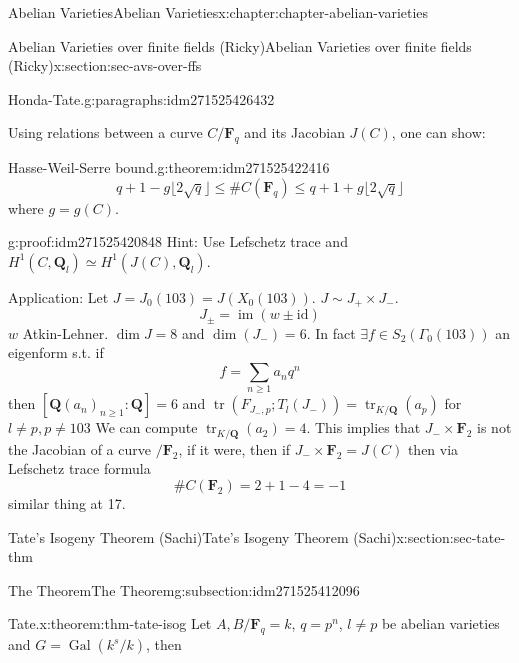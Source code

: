 \documentclass[oneside,10pt,]{book}
\numberwithin{equation}{section}
\newcommand{\lb}{[}
\newcommand{\rb}{]}
\newcommand{\QQ}{\mathbf{Q}}
\newcommand{\FF}{\mathbf{F}}
\newcommand{\id}{\mathrm{id}}
\DeclareMathOperator{\im}{im}
\DeclareMathOperator{\tr}{tr}
\newcommand{\Gal}[2]{\operatorname{Gal}(#1/#2)}
\begin{document}
\begin{chapterptx}{Abelian Varieties}{}{Abelian Varieties}{}{}{x:chapter:chapter-abelian-varieties}
\begin{sectionptx}{Abelian Varieties over finite fields (Ricky)}{}{Abelian Varieties over finite fields (Ricky)}{}{}{x:section:sec-avs-over-ffs}
\begin{paragraphs}{Honda-Tate.}{g:paragraphs:idm271525426432}
\end{paragraphs}%
\par
Using relations between a curve \(C/\FF_q\) and its Jacobian \(J(C) \), one can show:%
\begin{theorem}{Hasse-Weil-Serre bound.}{}{g:theorem:idm271525422416}%
%
\begin{equation*}
q + 1 - g\lfloor 2\sqrt q\rfloor \le \#C(\FF_{q}) \le q + 1 + g\lfloor 2\sqrt q\rfloor
\end{equation*}
where \(g=  g(C)\).%
\end{theorem}
\begin{proofptx}{}{g:proof:idm271525420848}
Hint: Use Lefschetz trace and \(H^1(C, \QQ_l) \simeq H^1(J(C) , \QQ_l)\).%
\end{proofptx}
Application: Let \(J = J_0(103) = J(X_0(103))\). \(J\sim J_+ \times J_-\).%
\begin{equation*}
J_{\pm} = \im(w \pm \id)
\end{equation*}
\(w\) Atkin-Lehner. \(\dim J = 8\) and \(\dim(J_-) = 6\). In fact \(\exists f\in  S_2( \Gamma_0(103))\) an eigenform s.t. if%
\begin{equation*}
f=\sum_{n\ge 1} a_n q^n
\end{equation*}
then \(\lb \QQ(a_n)_{n \ge 1}: \QQ\rb =6\) and \(\tr( F_{J_-,p};  T_l(J_-)) = \tr_{K/\QQ}(a_p)\)  for \(l \ne p, p\ne 103\) We can compute \(\tr_{K/\QQ} ( a_2) = 4\). This implies that \(J_- \times \FF_2\) is not the Jacobian of a curve \(/\FF_2\), if it were, then  if \(J_- \times \FF_2 = J(C)\) then via Lefschetz trace formula%
\begin{equation*}
\#C(\FF_2) = 2+1 - 4 = -1
\end{equation*}
similar thing at 17.%
\end{sectionptx}
%
%
\typeout{************************************************}
\typeout{************************************************}
%
\begin{sectionptx}{Tate's Isogeny Theorem (Sachi)}{}{Tate's Isogeny Theorem (Sachi)}{}{}{x:section:sec-tate-thm}
%
%
\typeout{************************************************}
\typeout{************************************************}
%
\begin{subsectionptx}{The Theorem}{}{The Theorem}{}{}{g:subsection:idm271525412096}
\begin{theorem}{Tate.}{}{x:theorem:thm-tate-isog}%
Let \(A,B/\FF_q = k\), \(q = p^n\), \(l\ne p\) be abelian varieties and \(G = \Gal{k^s}{k}\), then%

\end{theorem}
\end{subsectionptx}
\end{sectionptx}
\end{chapterptx}
\end{document}
